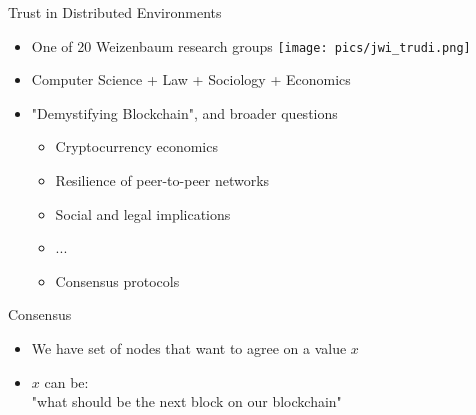 \documentclass{beamer}
\begin{document}
\begin{frame}{Trust in Distributed Environments}
 \begin{itemize}
    \item One of 20 Weizenbaum research groups
     \hfill \texttt{[image: pics/jwi\_trudi.png]}
    \item Computer Science + Law + Sociology + Economics
    \item "Demystifying Blockchain", and broader questions \begin{itemize}
      \item Cryptocurrency economics%
      \item Resilience of peer-to-peer networks%
      \item Social and legal implications%
      \item ...
      \vfill
      \item \alert{Consensus protocols}
    \end{itemize}
  \end{itemize}
\end{frame}

\begin{frame}{Consensus}
  \begin{itemize}
    \item We have set of \alert{nodes} that want to agree on a value $x$
    \item $x$ can be:\\
      "what should be the next block on our blockchain"
  \end{itemize}
\end{frame}
\end{document}
